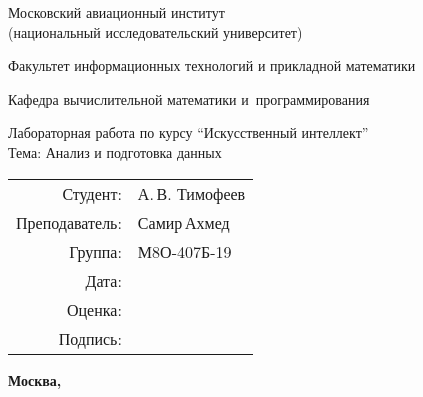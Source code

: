 \begin{titlepage}
\begin{center}
\bfseries

{\Large Московский авиационный институт\\ (национальный исследовательский университет)

}

\vspace{48pt}

{\large Факультет информационных технологий и прикладной математики
}

\vspace{36pt}

{\large Кафедра вычислительной математики и~программирования

}


\vspace{48pt}

Лабораторная работа  по курсу \enquote{Искусственный интеллект}\\
Тема: Анализ и подготовка данных

\end{center}

\vspace{72pt}

\begin{flushright}
\begin{tabular}{rl}
Студент: & А.\,В. Тимофеев \\
Преподаватель: & Самир\,Ахмед \\
Группа: & М8О-407Б-19 \\
Дата: & \\
Оценка: & \\
Подпись: & \\
\end{tabular}
\end{flushright}

\vfill

\begin{center}
\bfseries
Москва, \the\year
\end{center}
\end{titlepage}

\pagebreak